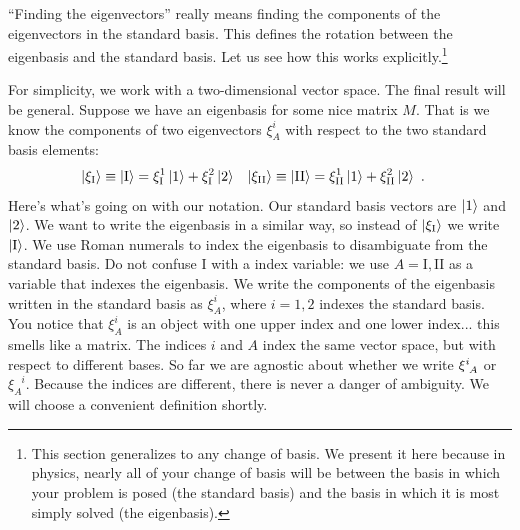 \documentclass[12pt, oneside]{report}    %
\begin{document}
``Finding the eigenvectors'' really means finding the components of the eigenvectors in the standard basis. This defines the rotation between the eigenbasis and the standard basis. Let us see how this works explicitly.\footnote{This section generalizes to any change of basis. We present it here because in physics, nearly all of your change of basis will be between the basis in which your problem is posed (the standard basis) and the basis in which it is most simply solved (the eigenbasis).}

For simplicity, we work with a two-dimensional vector space. The final result will be general. Suppose we have an eigenbasis for some nice matrix $M$. That is we know the components of two eigenvectors $\xi^i_{A}$ with respect to the two standard basis elements:
\begin{align}
    \left|\xi_\textnormal{I}\right\rangle \equiv \left|\textnormal{I}\right\rangle 
    & = 
    \xi^1_\textnormal{I} \left|1\right\rangle
    +
    \xi^2_\textnormal{I} \left|2\right\rangle
    &
    \left|\xi_\textnormal{II}\right\rangle \equiv \left|\textnormal{II}\right\rangle 
    & = 
    \xi^1_\textnormal{II} \left|1\right\rangle
    +
    \xi^2_\textnormal{II} \left|2\right\rangle \ .
    \label{eq:eigen:to:standard:basis}
\end{align}
Here's what's going on with our notation. Our standard basis vectors are $\left|1\right\rangle$ and $\left|2\right\rangle$. We want to write the eigenbasis in a similar way, so instead of $\left|\xi_\textnormal{I}\right\rangle$ we write $\left|\textnormal{I}\right\rangle$. We use Roman numerals to index the eigenbasis to disambiguate from the standard basis. Do not confuse $\text{I}$ with a index variable: we use $A = \text{I}, \text{II}$ as a variable that indexes the eigenbasis. We write the components of the eigenbasis written in the standard basis as $\xi^i_A$, where $i=1,2$ indexes the standard basis. You notice that $\xi^i_A$ is an object with one upper index and one lower index... this smells like a matrix. The indices $i$ and $A$ index the same vector space, but with respect to different bases. So far we are agnostic about whether we write $\xi\aij{i}{A}$ or $\xi_A^{\phantom{A}i}$. Because the indices are different, there is never a danger of ambiguity. We will choose a convenient definition shortly.
\end{document}
